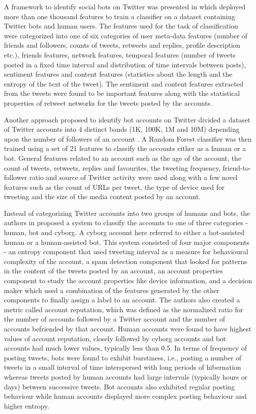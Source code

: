 \documentclass{llncs}
\begin{document}
A framework to identify social bots on Twitter was presented in \cite{varol2017online} which deployed more than one thousand features to train a classifier on a dataset containing Twitter bots and human users. The features used for the task of classification were categorized into one of six categories of user meta-data features (number of friends and followers, counts of tweets, retweets and replies, profile description etc.), friends features, network features, temporal features (number of tweets posted in a fixed time interval and distribution of time intervals between posts), sentiment features and content features (statistics about the length and the entropy of the text of the tweet). The sentiment and content features extracted from the tweets were found to be important features along with the statistical properties of retweet networks for the tweets posted by the accounts.

Another approach proposed to identify bot accounts on Twitter divided a dataset of Twitter accounts into 4 distinct bands (1K, 100K, 1M and 10M) depending upon the number of followers of an account \cite{gilani2017classification}. A Random Forest classifier was then trained using a set of 21 features to classify the accounts either as a human or a bot. General features related to an account such as the age of the account, the count of tweets, retweets, replies and favourites, the tweeting frequency, friend-to-follower ratio and source of Twitter activity were used along with a few novel features such as the count of URLs per tweet, the type of device used for tweeting and the size of the media content posted by an account.

Instead of categorizing Twitter accounts into two groups of humans and bots, the authors in \cite{chu2012detecting} proposed a system to classify the accounts to one of three categories - human, bot and cyborg. A cyborg account here referred to either a bot-assisted human or a human-assisted bot. This system consisted of four major components - an entropy component that used tweeting interval as a measure for behavioural complexity of the account, a spam detection component that looked for patterns in the content of the tweets posted by an account, an account properties component to study the account properties like device information, and a decision maker which used a combination of the features generated by the other components to finally assign a label to an account. The authors also created a metric called account reputation, which was defined as the normalized ratio for the number of accounts followed by a Twitter account and the number of accounts befriended by that account. Human accounts were found to have highest values of account reputation, closely followed by cyborg accounts and bot accounts had much lower values, typically less than 0.5. In terms of frequency of posting tweets, bots were found to exhibit burstiness, i.e., posting a number of tweets in a small interval of time interspersed with long periods of hibernation whereas tweets posted by human accounts had large intervals (typically hours or days) between successive tweets. Bot accounts also exhibited regular posting behaviour while human accounts displayed more complex posting behaviour and higher entropy.
\end{document}
